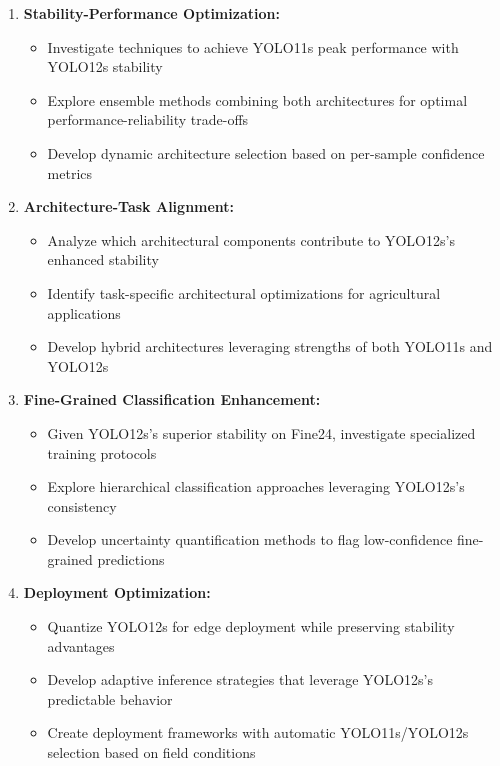 \begin{enumerate}
    \item \textbf{Stability-Performance Optimization:}
    \begin{itemize}
        \item Investigate techniques to achieve YOLO11s peak performance with YOLO12s stability
        \item Explore ensemble methods combining both architectures for optimal performance-reliability trade-offs
        \item Develop dynamic architecture selection based on per-sample confidence metrics
    \end{itemize}
    
    \item \textbf{Architecture-Task Alignment:}
    \begin{itemize}
        \item Analyze which architectural components contribute to YOLO12s's enhanced stability
        \item Identify task-specific architectural optimizations for agricultural applications
        \item Develop hybrid architectures leveraging strengths of both YOLO11s and YOLO12s
    \end{itemize}
    
    \item \textbf{Fine-Grained Classification Enhancement:}
    \begin{itemize}
        \item Given YOLO12s's superior stability on Fine24, investigate specialized training protocols
        \item Explore hierarchical classification approaches leveraging YOLO12s's consistency
        \item Develop uncertainty quantification methods to flag low-confidence fine-grained predictions
    \end{itemize}
    
    \item \textbf{Deployment Optimization:}
    \begin{itemize}
        \item Quantize YOLO12s for edge deployment while preserving stability advantages
        \item Develop adaptive inference strategies that leverage YOLO12s's predictable behavior
        \item Create deployment frameworks with automatic YOLO11s/YOLO12s selection based on field conditions
    \end{itemize}
\end{enumerate}

